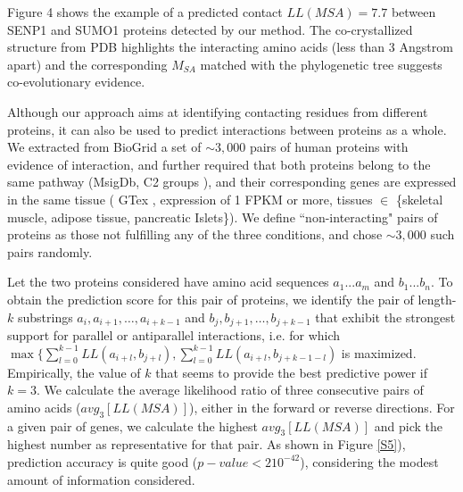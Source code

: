 
Figure 4 shows the example of a predicted contact $LL(MSA) = 7.7$ between SENP1 and SUMO1 proteins detected by our method. The co-crystallized structure from PDB highlights the interacting amino acids (less than 3 Angstrom apart) and the corresponding $M_{SA}$ matched with the phylogenetic tree suggests co-evolutionary evidence.

Although our approach aims at identifying contacting residues from different proteins, it can also be used to predict interactions between proteins as a whole. We extracted from BioGrid \cite{stark2006biogrid} a set of $\sim3,000$ pairs of human proteins with evidence of interaction, and further required that both proteins belong to the same pathway (MsigDb, C2 groups \cite{subramanian2005gene}), and their corresponding genes are expressed in the same tissue ( GTex \cite{lonsdale2013genotype}, expression of 1 FPKM or more, tissues $\in$ \{skeletal muscle, adipose tissue, pancreatic Islets\}). We define “non-interacting" pairs of proteins as those not fulfilling any of the three conditions, and chose $\sim3,000$ such pairs randomly.

Let the two proteins considered have amino acid sequences $a_1...a_m$ and $b_1...b_n$. To obtain the prediction score for this pair of proteins, we identify the pair of length-$k$ substrings $a_i, a_{i+1}, …, a_{i+k-1}$ and $b_j, b_{j+1}, …, b_{j+k-1}$ that exhibit the strongest support for parallel or antiparallel interactions, i.e. for which $ \max \{ \sum_{l=0}^{k-1} LL(a_{i+l},b_{j+l}),  \sum_{l=0}^{k-1} LL(a_{i+l},b_{j+k-1-l})$ is maximized. Empirically, the value of $k$ that seems to provide the best predictive power if $k=3$. We calculate the average likelihood ratio of three consecutive pairs of amino acids ($avg_3[LL(MSA)]$), either in the forward or reverse directions. For a given pair of genes, we calculate the highest $avg_3[LL(MSA)]$ and pick the highest number as representative for that pair. As shown in Figure \ref{S5}), prediction accuracy is quite good ($p-value < 2 10^{-42}$), considering the modest amount of information considered.


